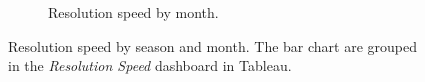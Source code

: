 \begin{figure}[h!]
\begin{subfigure}{0.55\textwidth}
        \caption{Resolution speed by month.}
        \label{fig:3_3_resolution_speed_by_month}
    \end{subfigure}
    \caption{Resolution speed by season and month. The bar chart are grouped in the \textit{Resolution Speed} dashboard in Tableau.}
    \label{fig:3_3_resolution_speed_by_season_and_month}
\end{figure}
